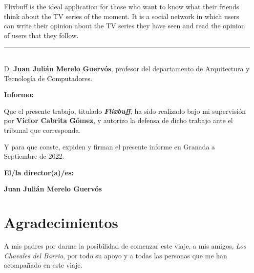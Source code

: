 Flixbuff is the ideal application for those who want to know what their friends think about the TV series of the moment. It is a social network in which users can write their opinion about the TV series they have seen and read the opinion of users that they follow.

\cleardoublepage{}

\thispagestyle{empty}

\noindent\rule[-1ex]{\textwidth}{2pt}\\[4.5ex]

D. \textbf{Juan Julián Merelo Guervós}, profesor del departamento de Arquitectura y Tecnología de Computadores.

\vspace{0.5cm}

\textbf{Informo:}

\vspace{0.5cm}

Que el presente trabajo, titulado \textit{\textbf{Flixbuff}},
ha sido realizado bajo mi supervisión por \textbf{Víctor Cabrita Gómez}, y autorizo la defensa de dicho trabajo ante el tribunal
que corresponda.

\vspace{0.5cm}

Y para que conste, expiden y firman el presente informe en Granada a Septiembre de 2022.

\vspace{1cm}

\textbf{El/la director(a)/es: }

\vspace{5cm}

\noindent \textbf{Juan Julián Merelo Guervós}

\chapter*{Agradecimientos}

A mis padres por darme la posibilidad de comenzar este viaje, a mis amigos, \textit{Los Chavales del Barrio}, por todo su apoyo y a todas las personas que me han acompañado en este viaje.